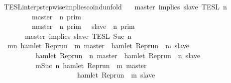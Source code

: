 \begin{isabellebody}
\isanewline
{}\isamarkupfalse%
\ TESL{\isacharunderscore}interp{\isacharunderscore}stepwise{\isacharunderscore}implies{\isacharunderscore}coind{\isacharunderscore}unfold{\isacharcolon}\isanewline
\ \ {\isacartoucheopen}{\isasymlbrakk}\ master\ implies\ slave\ {\isasymrbrakk}\isactrlsub T\isactrlsub E\isactrlsub S\isactrlsub L\isactrlbsup {\isasymge}\ n\isactrlesup \ {\isacharequal}\isanewline
\ \ \ \ \ {\isacharparenleft}\ \ \ {\isasymlbrakk}\ master\ {\isasymnot}{\isasymUp}\ n\ {\isasymrbrakk}\isactrlsub p\isactrlsub r\isactrlsub i\isactrlsub m\ \ \ \ \ \ \ \ \ \ \ \ \ \ \ \ \ \ \ \ \ %
\isanewline
\ \ \ \ \ \ \ {\isasymunion}\ {\isasymlbrakk}\ master\ {\isasymUp}\ n\ {\isasymrbrakk}\isactrlsub p\isactrlsub r\isactrlsub i\isactrlsub m\ {\isasyminter}\ {\isasymlbrakk}\ slave\ {\isasymUp}\ n\ {\isasymrbrakk}\isactrlsub p\isactrlsub r\isactrlsub i\isactrlsub m{\isacharparenright}\ \ %
\isanewline
\ \ \ \ \ {\isasyminter}\ {\isasymlbrakk}\ master\ implies\ slave\ {\isasymrbrakk}\isactrlsub T\isactrlsub E\isactrlsub S\isactrlsub L\isactrlbsup {\isasymge}\ Suc\ n\isactrlesup {\isacartoucheclose}\isanewline
%
\isadelimproof
%
\endisadelimproof
%
\isatagproof
{}\isamarkupfalse%
\ {\isacharminus}\isanewline
\ \ \isamarkupfalse%
\ {\isacartoucheopen}{\isacharbraceleft}{\isasymrho}{\isachardot}\ {\isasymforall}m{\isasymge}n{\isachardot}\ hamlet\ {\isacharparenleft}{\isacharparenleft}Rep{\isacharunderscore}run\ {\isasymrho}{\isacharparenright}\ m\ master{\isacharparenright}\ {\isasymlongrightarrow}\ hamlet\ {\isacharparenleft}{\isacharparenleft}Rep{\isacharunderscore}run\ {\isasymrho}{\isacharparenright}\ m\ slave{\isacharparenright}{\isacharbraceright}\isanewline
\ \ \ \ \ \ \ \ {\isacharequal}\ {\isacharbraceleft}{\isasymrho}{\isachardot}\ hamlet\ {\isacharparenleft}{\isacharparenleft}Rep{\isacharunderscore}run\ {\isasymrho}{\isacharparenright}\ n\ master{\isacharparenright}\ {\isasymlongrightarrow}\ hamlet\ {\isacharparenleft}{\isacharparenleft}Rep{\isacharunderscore}run\ {\isasymrho}{\isacharparenright}\ n\ slave{\isacharparenright}{\isacharbraceright}\isanewline
\ \ \ \ \ \ \ \ {\isasyminter}\ {\isacharbraceleft}{\isasymrho}{\isachardot}\ {\isasymforall}m{\isasymge}Suc\ n{\isachardot}\ hamlet\ {\isacharparenleft}{\isacharparenleft}Rep{\isacharunderscore}run\ {\isasymrho}{\isacharparenright}\ m\ master{\isacharparenright}\isanewline
\ \ \ \ \ \ \ \ \ \ \ \ \ \ \ \ \ \ \ \ \ {\isasymlongrightarrow}\ hamlet\ {\isacharparenleft}{\isacharparenleft}Rep{\isacharunderscore}run\ {\isasymrho}{\isacharparenright}\ m\ slave{\isacharparenright}{\isacharbraceright}{\isacartoucheclose}\isanewline

\end{isabellebody}
